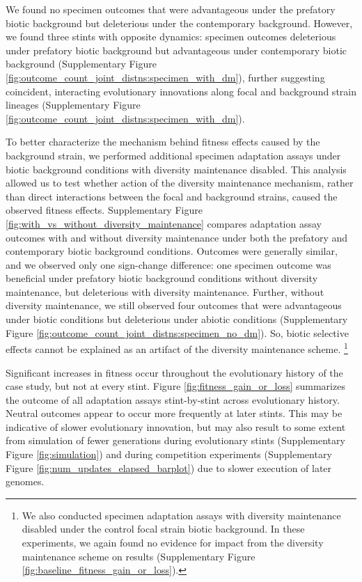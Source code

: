 We found no specimen outcomes that were advantageous under the prefatory biotic background but deleterious under the contemporary background.
However, we found three stints with opposite dynamics: specimen outcomes deleterious under prefatory biotic background but advantageous under contemporary biotic background (Supplementary Figure \ref{fig:outcome_count_joint_distns:specimen_with_dm}), further suggesting coincident, interacting evolutionary innovations along focal and background strain lineages (Supplementary Figure \ref{fig:outcome_count_joint_distns:specimen_with_dm}).

To better characterize the mechanism behind fitness effects caused by the background strain, we performed additional specimen adaptation assays under biotic background conditions with diversity maintenance disabled.
This analysis allowed us to test whether action of the diversity maintenance mechanism, rather than direct interactions between the focal and background strains, caused the observed fitness effects.
Supplementary Figure \ref{fig:with_vs_without_diversity_maintenance} compares adaptation assay outcomes with and without diversity maintenance under both the prefatory and contemporary biotic background conditions.
Outcomes were generally similar, and we observed only one sign-change difference: one specimen outcome was beneficial under prefatory biotic background conditions without diversity maintenance, but deleterious with diversity maintenance.
Further, without diversity maintenance, we still observed four outcomes that were advantageous under biotic conditions but deleterious under abiotic conditions (Supplementary Figure \ref{fig:outcome_count_joint_distns:specimen_no_dm}).
So, biotic selective effects cannot be explained as an artifact of the diversity maintenance scheme.%
\footnote{
We also conducted specimen adaptation assays with diversity maintenance disabled under the control focal strain biotic background.
In these experiments, we again found no evidence for impact from the diversity maintenance scheme on results
(Supplementary Figure \ref{fig:baseline_fitness_gain_or_loss}).
}

Significant increases in fitness occur throughout the evolutionary history of the case study, but not at every stint.
Figure \ref{fig:fitness_gain_or_loss} summarizes the outcome of all adaptation assays stint-by-stint across evolutionary history.
Neutral outcomes appear to occur more frequently at later stints.
This may be indicative of slower evolutionary innovation, but may also result to some extent from simulation of fewer generations during evolutionary stints (Supplementary Figure \ref{fig:simulation}) and during competition experiments (Supplementary Figure \ref{fig:num_updates_elapsed_barplot}) due to slower execution of later genomes.

